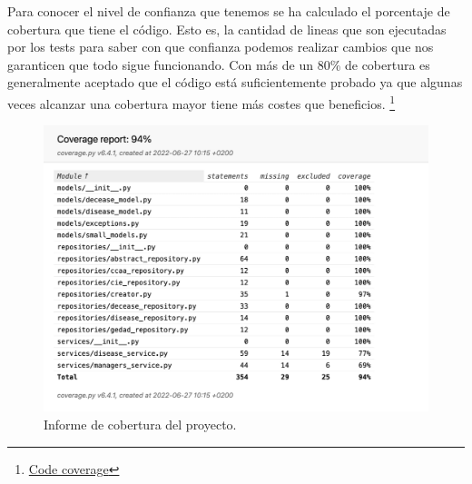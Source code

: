 Para conocer el nivel de confianza que tenemos se ha calculado el porcentaje de cobertura
que tiene el código. Esto es, la cantidad de lineas que son ejecutadas por los tests para
saber con que confianza podemos realizar cambios que nos garanticen que todo sigue
funcionando. Con más de un 80\% de cobertura es generalmente aceptado que el código está
suficientemente probado ya que algunas veces alcanzar una cobertura mayor tiene más costes
que beneficios.
\footnote{\href{https://www.atlassian.com/continuous-delivery/software-testing/code-coverage}{Code
coverage}}

\FloatBarrier
\begin{figure}[h]
	\centering	
	\includegraphics[width=\textwidth]{doc/logos/imgs/cobertura.jpg}
    \caption{ Informe de cobertura del proyecto.}
    \label{fig:cobertura-tests}
\end{figure}
\FloatBarrier


